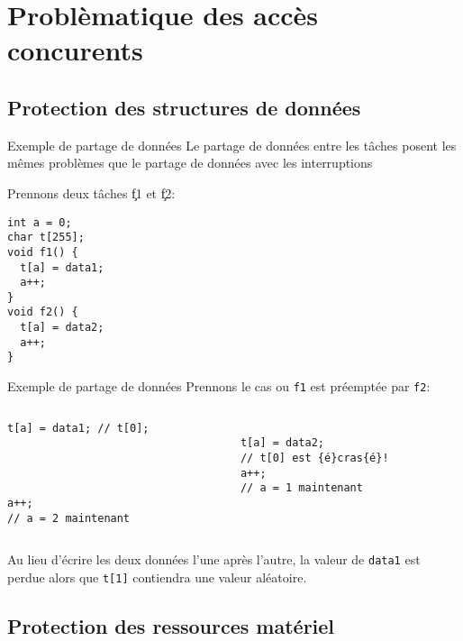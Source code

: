 \section{Problèmatique des accès concurents}

\subsection{Protection des structures de données}

\begin{frame}[fragile]{Exemple de partage de données}
  Le partage de données entre les tâches posent les mêmes problèmes que
  le partage de données avec les interruptions

  Prennons deux tâches \c{f1} et \c{f2}:
  \begin{lstlisting}
int a = 0;
char t[255];
void f1() {
  t[a] = data1;
  a++;
}
void f2() {
  t[a] = data2;
  a++;
}
       \end{lstlisting}
\end{frame}

\begin{frame}[fragile]{Exemple de partage de données}
Prennons le cas ou \verb+f1+ est préemptée par \verb+f2+:
  \begin{columns}
    \begin{column}{5cm}
      \begin{lstlisting}[showlines=true,emptylines=10]
t[a] = data1; // t[0];




a++;
// a = 2 maintenant
       \end{lstlisting}
     \end{column}
     \begin{column}{5cm}
      \begin{lstlisting}[showlines=true,emptylines=10,escapeinside=\{\}]

t[a] = data2;
// t[0] est {é}cras{é}!
a++;
// a = 1 maintenant


       \end{lstlisting}
    \end{column}
  \end{columns}

  Au lieu d'écrire  les deux données l'une après  l'autre, la valeur de
  \verb+data1+ est perdue alors  que \verb+t[1]+ contiendra une valeur
  aléatoire.
\end{frame}

\subsection{Protection des ressources matériel}

